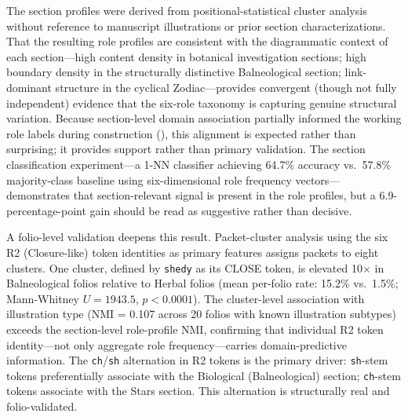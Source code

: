 \documentclass[11pt,a4paper,twocolumn]{article}
\begin{document}
The section profiles were derived from positional-statistical cluster analysis without reference to manuscript illustrations or prior section characterizations. That the resulting role profiles are consistent with the diagrammatic context of each section---high content density in botanical investigation sections; high boundary density in the structurally distinctive Balneological section; link-dominant structure in the cyclical Zodiac---provides convergent (though not fully independent) evidence that the six-role taxonomy is capturing genuine structural variation. Because section-level domain association partially informed the working role labels during construction (), this alignment is expected rather than surprising; it provides support rather than primary validation. The section classification experiment---a 1-NN classifier achieving 64.7\% accuracy vs.\ 57.8\% majority-class baseline using six-dimensional role frequency vectors---demonstrates that section-relevant signal is present in the role profiles, but a 6.9-percentage-point gain should be read as suggestive rather than decisive.

A folio-level validation deepens this result. Packet-cluster analysis using the six R2 (Closure-like) token identities as primary features assigns packets to eight clusters. One cluster, defined by \texttt{shedy} as its CLOSE token, is elevated 10$\times$ in Balneological folios relative to Herbal folios (mean per-folio rate: 15.2\% vs.\ 1.5\%; Mann-Whitney $U = 1943.5$, $p < 0.0001$). The cluster-level association with illustration type (NMI = 0.107 across 20 folios with known illustration subtypes) exceeds the section-level role-profile NMI, confirming that individual R2 token identity---not only aggregate role frequency---carries domain-predictive information. The \texttt{ch}/\texttt{sh} alternation in R2 tokens is the primary driver: \texttt{sh}-stem tokens preferentially associate with the Biological (Balneological) section; \texttt{ch}-stem tokens associate with the Stars section. This alternation is structurally real and folio-validated.
\end{document}
